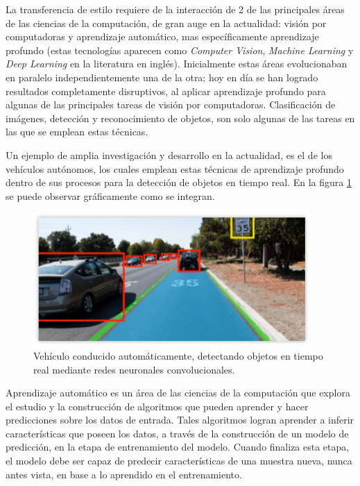 \documentclass[a4paper,11pt,spanish]{book}
\begin{document}
    La transferencia de estilo requiere de la interacción de 2 de las principales áreas de las ciencias de la computación, de gran auge en la actualidad: 
    visión por computadoras y aprendizaje automático, mas específicamente aprendizaje profundo 
    (estas tecnologías aparecen como \emph{Computer Vision}, \emph{Machine Learning} y \emph{Deep Learning} en la literatura en inglés).
    Inicialmente estas áreas evolucionaban en paralelo independientemente una de la otra; hoy en día se han logrado resultados completamente disruptivos, al aplicar
    aprendizaje profundo para algunas de las principales tareas de visión por computadoras.
    Clasificación de imágenes, detección y reconocimiento de objetos, son solo algunas de las tareas en las que se emplean estas técnicas.

    Un ejemplo de amplia investigación y desarrollo en la actualidad, es el de los vehículos autónomos,
    los cuales emplean estas técnicas de aprendizaje profundo dentro de sus procesos para la detección de objetos en tiempo real. 
    En la figura \ref{fig:car_detection} se puede observar gráficamente como se integran.

    \begin{figure}[h]
      \includegraphics[width=0.9\linewidth]{./img/nvidia_car_detection.png}
      \caption{Vehículo conducido automáticamente, detectando objetos en tiempo real mediante redes neuronales convolucionales.}
      \label{fig:car_detection}
    \end{figure}
    
    Aprendizaje automático es un área de las ciencias de la computación que explora el estudio y la construcción de algoritmos que pueden aprender y hacer 
    predicciones sobre los datos de entrada.
    Tales algoritmos logran aprender a inferir características que poseen los datos, a través de la construcción de un modelo de predicción, en la etapa de entrenamiento 
    del modelo.
    Cuando finaliza esta etapa, el modelo debe ser capaz de predecir características de una muestra nueva, nunca antes vista, en base a lo aprendido en el entrenamiento.
\end{document}
